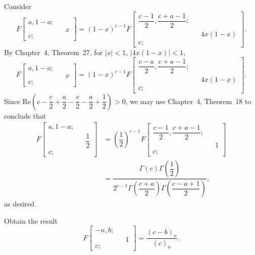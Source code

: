 \begin{solution}
Consider 
$$F \left[ \begin{array}{rlr}
a,1-a; & & \\
& & x \\
c; & & 
\end{array} \right] = (1-x)^{c-1} F \left[ \begin{array}{rlr}
\dfrac{c-1}{2}, \dfrac{c+a-1}{2}; & & \\
& & 4x(1-x) \\
c ; & & 
\end{array} \right].$$
By Chapter~4, Theorem~27, for $|x| < 1$, $|4x(1-x)| < 1$,
$$F \left[ \begin{array}{rlr}
a,1-a; & & \\
& & x \\
c; & &
\end{array} \right] = (1-x)^{c-1} F \left[ \begin{array}{rlr}
\dfrac{c-a}{2}, \dfrac{c+a-1}{2}; & & \\
& & 4x(1-x) \\
c; & &
\end{array} \right].$$
Since $\mathrm{Re} \left( c - \dfrac{c}{2} + \dfrac{a}{2} - \dfrac{c}{2} - \dfrac{a}{2} + \dfrac{1}{2} \right) > 0$, we may use Chapter~4, Theorem~18 to conclude that
$$\begin{array}{ll}
F \left[ \begin{array}{rlr}
a,1-a; & & \\
& & \dfrac{1}{2} \\
c; & & 
\end{array} \right] &= \left( \dfrac{1}{2} \right)^{c-1} F \left[ \begin{array}{rlr}
\dfrac{c-1}{2}, \dfrac{c+a-1}{2}; & & \\
& & 1 \\
c; & & 
\end{array} \right] \\
&= \dfrac{ \Gamma(c) \Gamma \left( \dfrac{1}{2} \right)}{2^{c-1} \Gamma \left( \dfrac{c+a}{2} \right) \Gamma \left( \dfrac{c-a+1}{2} \right)},
\end{array}$$
as desired.
\end{solution}
\begin{problem}\label{problem4chapter4}
Obtain the result
$$F \left[ \begin{array}{rlr}
-n,b; & & \\
& & 1 \\
c; & &
\end{array} \right] = \dfrac{(c-b)_n}{(c)_n}.$$
\end{problem}
